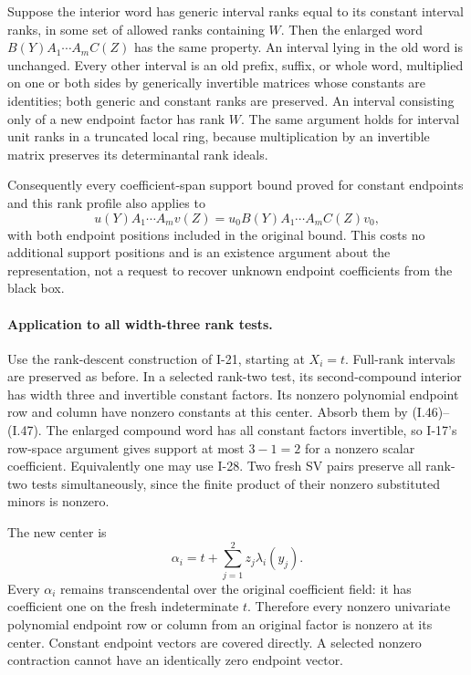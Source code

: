 \documentclass[11pt,a4paper]{article}
\theoremstyle{definition}\newtheorem{definition}{Definition}
\begin{document}
Suppose the interior word has generic interval ranks equal
to its constant interval ranks, in some set of allowed ranks
containing $W$.  Then the enlarged word
$B(Y)A_1\cdots A_m C(Z)$ has the same property.  An interval
lying in the old word is unchanged.  Every other interval is
an old prefix, suffix, or whole word, multiplied on one or
both sides by generically invertible matrices whose constants
are identities; both generic and constant ranks are preserved.
An interval consisting only of a new endpoint factor has
rank $W$.  The same argument holds for interval unit ranks
in a truncated local ring, because multiplication by an
invertible matrix preserves its determinantal rank ideals.

Consequently every coefficient-span support bound proved for
constant endpoints and this rank profile also applies to
\[
 u(Y)A_1\cdots A_m v(Z)
      =u_0B(Y)A_1\cdots A_m C(Z)v_0,
\]
with both endpoint positions included in the original bound.
This costs no additional support positions and is an
existence argument about the representation, not a request
to recover unknown endpoint coefficients from the black box.

\paragraph{Application to all width-three rank tests.}
Use the rank-descent construction of I-21, starting at
$X_i=t$.  Full-rank intervals are preserved as before.
In a selected rank-two test, its second-compound interior
has width three and invertible constant factors.  Its
nonzero polynomial endpoint row and column have nonzero
constants at this center.  Absorb them by (I.46)--(I.47).
The enlarged compound word has all constant factors
invertible, so I-17's row-space argument gives support at
most $3-1=2$ for a nonzero scalar coefficient.  Equivalently
one may use I-28.  Two fresh SV pairs preserve all rank-two
tests simultaneously, since the finite product of their
nonzero substituted minors is nonzero.

The new center is
\[
 \alpha_i=t+\sum_{j=1}^2z_j\lambda_i(y_j).
\]
Every $\alpha_i$ remains transcendental over the original
coefficient field: it has coefficient one on the fresh
indeterminate $t$.  Therefore every nonzero univariate
polynomial endpoint row or column from an original factor
is nonzero at its center.  Constant endpoint vectors are
covered directly.  A selected nonzero contraction cannot
have an identically zero endpoint vector.
\end{document}

